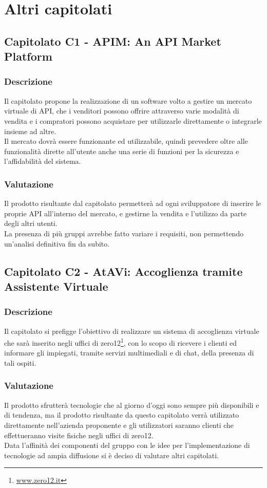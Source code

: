 \section{Altri capitolati}

\subsection{Capitolato C1 - APIM: An API Market Platform}
\subsubsection{Descrizione}
Il capitolato propone la realizzazione di un software volto a gestire un mercato virtuale di API, che i venditori possono offrire attraverso varie modalità di vendita e i compratori possono acquistare per utilizzarle direttamente o integrarle insieme ad altre.\\
Il mercato dovrà essere funzionante ed utilizzabile, quindi prevedere oltre alle funzionalità dirette all'utente anche una serie di funzioni per la sicurezza e l'affidabilità del sistema.

\subsubsection{Valutazione}
Il prodotto risultante dal capitolato permetterà ad ogni sviluppatore di inserire le proprie API all'interno del mercato, e gestirne la vendita e l'utilizzo da parte degli altri utenti.\\
La presenza di più gruppi avrebbe fatto variare i requisiti, non permettendo un'analisi definitiva fin da subito.

\subsection{Capitolato C2 - AtAVi: Accoglienza tramite Assistente Virtuale}
\subsubsection{Descrizione}
Il capitolato si prefigge l'obiettivo di realizzare un sistema di accoglienza virtuale che sarà inserito negli uffici di zero12\footnote{\url{www.zero12.it}}, con lo scopo di ricevere i clienti ed informare gli impiegati, tramite servizi multimediali e di chat, della presenza di tali ospiti.

\subsubsection{Valutazione}
Il prodotto sfrutterà tecnologie che al giorno d'oggi sono sempre più disponibili e di tendenza, ma il prodotto risultante da questo capitolato verrà utilizzato direttamente nell'azienda proponente e gli utilizzatori saranno clienti che effettueranno visite fisiche negli uffici di zero12.\\
Data l'affinità dei componenti del gruppo con le idee per l'implementazione di tecnologie  ad ampia diffusione si è deciso di valutare altri capitolati.

